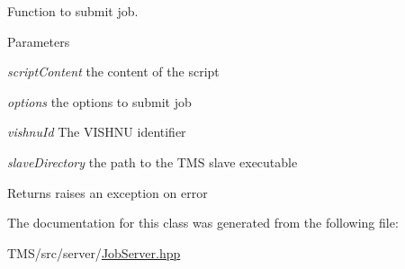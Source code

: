 Function to submit job. 


\begin{DoxyParams}{Parameters}
\item[{\em scriptContent}]the content of the script \item[{\em options}]the options to submit job \item[{\em vishnuId}]The VISHNU identifier \item[{\em slaveDirectory}]the path to the TMS slave executable \end{DoxyParams}
\begin{DoxyReturn}{Returns}
raises an exception on error 
\end{DoxyReturn}


The documentation for this class was generated from the following file:\begin{DoxyCompactItemize}
\item 
TMS/src/server/\hyperlink{JobServer_8hpp}{JobServer.hpp}\end{DoxyCompactItemize}

